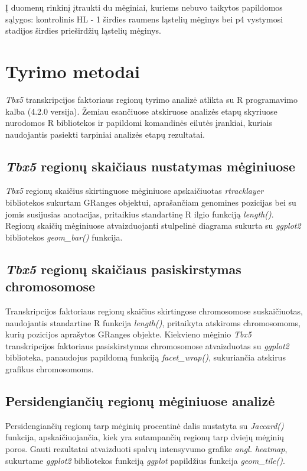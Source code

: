 \documentclass[12pt]{article}
\begin{document}
Į duomenų rinkinį įtraukti du mėginiai, kuriems nebuvo taikytos papildomos
sąlygos: kontrolinis HL - 1 širdies raumens ląstelių mėginys bei p4
vystymosi stadijos širdies prieširdžių ląstelių mėginys.
\newpage


\section{Tyrimo metodai}
\emph{Tbx5} transkripcijos faktoriaus regionų tyrimo analizė atlikta
su R programavimo kalba (4.2.0 versija). Žemiau esančiuose atskiruose
analizės etapų skyriuose nurodomos R bibliotekos ir papildomi komandinės
eilutės įrankiai, kuriais naudojantis pasiekti tarpiniai analizės etapų
rezultatai.

\subsection{\emph{Tbx5} regionų skaičiaus nustatymas mėginiuose}
\emph{Tbx5} regionų skaičius skirtinguose mėginiuose apskaičiuotas
\emph{rtracklayer} bibliotekos sukurtam GRanges objektui, aprašančiam
genomines pozicijas bei su jomis susijusias anotacijas, pritaikius
standartinę R ilgio funkciją \emph{length()}.
Regionų skaičių mėginiuose atvaizduojanti stulpelinė diagrama sukurta
su \emph{ggplot2} bibliotekos \emph{geom\_bar()} funkcija.

\subsection{\emph{Tbx5} regionų skaičiaus pasiskirstymas chromosomose}
Transkripcijos faktoriaus regionų skaičius skirtingose chromosomose
suskaičiuotas, naudojantis standartine R funkcija \emph{length()},
pritaikyta atskiroms chromosomoms, kurių pozicijos aprašytos GRanges
objekte.
Kiekvieno mėginio \emph{Tbx5} transkripcijos faktoriaus pasiskirstymas
chromosomose atvaizduotas su \emph{ggplot2} biblioteka, panaudojus
papildomą funkciją \emph{facet\_wrap()}, sukuriančia atskirus 
grafikus chromosomoms.

\subsection{Persidengiančių regionų mėginiuose analizė}
Persidengiančių regionų tarp mėginių procentinė dalis nustatyta
su \emph{Jaccard()} funkcija, apskaičiuojančia, kiek yra sutampančių
regionų tarp dviejų mėginių poros.
Gauti rezultatai atvaizduoti spalvų intensyvumo grafike \emph{angl.
heatmap}, sukurtame \emph{ggplot2} bibliotekos funkciją \emph{ggplot}
papildžius funkcija \emph{geom\_tile()}.
\end{document}
